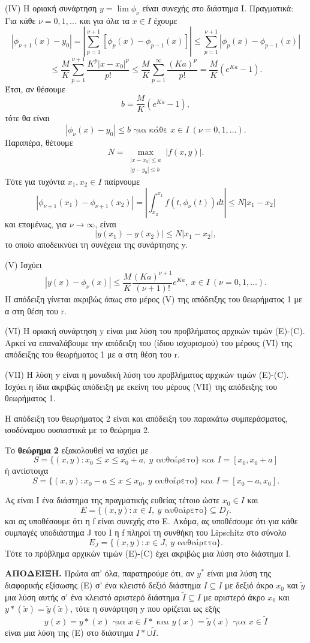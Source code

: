 \documentclass[11pt,a4paper,twoside]{book}
\newcommand{\titlefont}[1]{{\fontfamily{maksf}\selectfont #1}}
\newcounter{thewrhma}[chapter]
\renewcommand{\thethewrhma}{\thechapter.\arabic{thewrhma}}
\newcommand{\thewr}{\refstepcounter{thewrhma}{\bf\titlefont{\textcolor{secondarycolor}{\large Θεώρημα\hspace{2mm}\thethewrhma}}}\hspace{1mm}}{}
\newenvironment{Thewrhma}[1]
{\begin{tcolorbox}[title=\thewr\ \ :\ \  {\textcolor{black}{\bf{\large\titlefont{#1}}}},
breakable,
enhanced standard,
titlerule=-.2pt,
toprule=0pt, 
rightrule=0pt, 
bottomrule=0pt,
colback=white,
left=2mm,
top=1mm,
bottom=0mm,
boxrule=0pt,
colframe=white,
borderline west={1.5mm}{0pt}{secondarycolor},
leftrule=2mm,
sharp corners,
coltitle=secondarycolor]}
{\end{tcolorbox}}
\begin{document}
(IV) Η οριακή συνάρτηση $y = \lim \phi_\nu$ είναι συνεχής στο διάστημα Ι. Πραγματικά: Για κάθε $\nu=0,1,\dots$ και για όλα τα $x \in I$ έχουμε
\[
|\phi_{\nu+1}(x) - y_0| = \left|\sum_{p=1}^{\nu+1} [\phi_p(x)-\phi_{p-1}(x)]\right| \le \sum_{p=1}^{\nu+1} |\phi_p(x)-\phi_{p-1}(x)|
\]
\[
\le \frac{M}{K} \sum_{p=1}^{\nu+1} \frac{K^p|x-x_0|^p}{p!} \le \frac{M}{K} \sum_{p=1}^\infty \frac{(Ka)^p}{p!} = \frac{M}{K}(e^{Ka}-1).
\]
Έτσι, αν θέσουμε
\[
b = \frac{M}{K}(e^{Ka}-1),
\]
τότε θα είναι
\[
|\phi_\nu(x) - y_0| \le b \text{ για κάθε } x \in I \ (\nu=0,1,\dots).
\]
Παραπέρα, θέτουμε
\[
N = \max_{\substack{|x-x_0| \le a \\ |y-y_0| \le b}} |f(x,y)|.
\]
Τότε για τυχόντα $x_1, x_2 \in I$ παίρνουμε
\[
|\phi_{\nu+1}(x_1)-\phi_{\nu+1}(x_2)| = \left|\int_{x_2}^{x_1} f(t,\phi_\nu(t))dt \right| \le N|x_1-x_2|
\]
και επομένως, για $\nu \to \infty$, είναι
\[
|y(x_1)-y(x_2)| \le N|x_1-x_2|,
\]
το οποίο αποδεικνύει τη συνέχεια της συνάρτησης y.

(V) Ισχύει
\[
|y(x)-\phi_\nu(x)| \le \frac{M}{K} \frac{(Ka)^{\nu+1}}{(\nu+1)!}e^{Ka}, \ x \in I \ (\nu=0,1,\dots).
\]
Η απόδειξη γίνεται ακριβώς όπως στο μέρος (V) της απόδειξης του θεωρήματος 1 με α στη θέση του r.

(VI) Η οριακή συνάρτηση y είναι μια λύση του προβλήματος αρχικών τιμών (E)-(C). Αρκεί να επαναλάβουμε την απόδειξη του (ίδιου ισχυρισμού) του μέρους (VI) της απόδειξης του θεωρήματος 1 με α στη θέση του r.

(VII) Η λύση y είναι η μοναδική λύση του προβλήματος αρχικών τιμών (E)-(C). Ισχύει η ίδια ακριβώς απόδειξη με εκείνη του μέρους (VII) της απόδειξης του θεωρήματος 1.

\vspace{5mm}

Η απόδειξη του θεωρήματος 2 είναι και απόδειξη του παρακάτω συμπεράσματος, ισοδύναμου ουσιαστικά με το θεώρημα 2.

Το \textbf{θεώρημα 2} εξακολουθεί να ισχύει με
\[
S = \{(x,y): x_0 \le x \le x_0+a, \ y \text{ αυθαίρετο}\} \text{ και } I=[x_0, x_0+a]
\]
ή αντίστοιχα
\[
S = \{(x,y): x_0-a \le x \le x_0, \ y \text{ αυθαίρετο}\} \text{ και } I=[x_0-a, x_0].
\]
\begin{Thewrhma}{}Ας είναι Ι ένα διάστημα της πραγματικής ευθείας τέτοιο ώστε $x_0 \in I$ και
\[
E = \{(x,y): x \in I, \ y \text{ αυθαίρετο}\} \subseteq D_f.
\]
και ας υποθέσουμε ότι η f είναι συνεχής στο E. Ακόμα, ας υποθέσουμε ότι για κάθε συμπαγές υποδιάστημα J του I η f πληροί τη συνθήκη του Lipschitz στο σύνολο
\[
E_J = \{(x,y): x \in J, \ y \text{ αυθαίρετο}\}.
\]
Τότε το πρόβλημα αρχικών τιμών (E)-(C) έχει ακριβώς μια λύση στο διάστημα I.
\end{Thewrhma}
\textbf{ΑΠΟΔΕΙΞΗ.} Πρώτα απ' όλα, παρατηρούμε ότι, αν $y^*$ είναι μια λύση της διαφορικής εξίσωσης (E) σ' ένα κλειστό δεξιό διάστημα $I \subseteq I$ με δεξιό άκρο $x_0$ και $\tilde{y}$ μια λύση αυτής σ' ένα κλειστό αριστερό διάστημα $\tilde{I} \subseteq I$ με αριστερό άκρο $x_0$ και $y*(\tilde{x})=\tilde{y}(\tilde{x})$, τότε η συνάρτηση y που ορίζεται ως εξής
\[
y(x) = y*(x) \text{ για } x \in I* \text{ και } y(x) = \tilde{y}(x) \text{ για } x \in \tilde{I}
\]
είναι μια λύση της (Ε) στο διάστημα $I* \cup \tilde{I}$.
\end{document}
